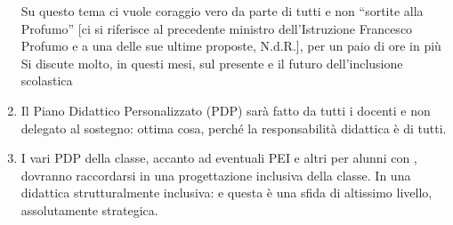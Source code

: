 \begin{enumerate}
	Su questo tema ci vuole coraggio vero da parte di tutti e non “sortite alla Profumo” [ci si riferisce al precedente ministro dell'Istruzione Francesco Profumo e a una delle sue ultime proposte, N.d.R.], per un paio di ore in più
	Si discute molto, in questi mesi, sul presente e il futuro dell'inclusione scolastica
	\item Il Piano Didattico Personalizzato (PDP) sarà fatto da tutti i docenti e non delegato al sostegno: ottima cosa, perché la responsabilità didattica è di tutti.
	\item I vari PDP della classe, accanto ad eventuali PEI   e altri   per alunni con , dovranno raccordarsi in una progettazione inclusiva della classe. In una didattica strutturalmente inclusiva: e questa è una sfida di altissimo livello, assolutamente strategica.
	

\end{enumerate}
